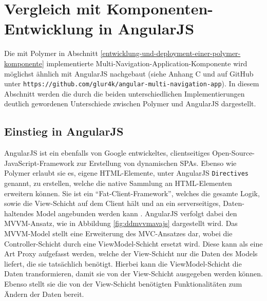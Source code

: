 \section{Vergleich mit Komponenten-Entwicklung in AngularJS}\label{vergleich-mit-komponenten-entwicklung-in-angularjs}

Die mit Polymer in Abschnitt \ref{entwicklung-und-deployment-einer-polymer-komponente} implementierte Multi-Navigation-Application-Kom\-po\-nen\-te wird möglichst ähnlich mit AngularJS nachgebaut (siehe Anhang C und auf GitHub unter \texttt{https://github.com/glur4k/angular-multi-navigation-app}). In diesem Abschnitt werden die durch die beiden unterschiedlichen Implementierungen deutlich gewordenen Unterschiede zwischen Polymer und AngularJS dargestellt.


\subsection{Einstieg in AngularJS}\label{einstieg-in-angularjs}

AngularJS ist ein ebenfalls von Google entwickeltes, clientseitiges Open-Source-JavaScript-Framework zur Erstellung von dynamischen \ac{SPA}s. Ebenso wie Polymer erlaubt sie es, eigene \ac{HTML}-Elemente, unter AngularJS \texttt{Directives} genannt, zu erstellen, welche die native Sammlung an \ac{HTML}-Elementen erweitern können. Sie ist ein ``Fat-Client-Framework'', welches die gesamte Logik, sowie die View-Schicht auf dem Client hält und an ein serverseitiges, Daten-haltendes Model angebunden werden kann \cite{citeulike:13920434}. AngularJS verfolgt dabei den \ac{MVVM}-Ansatz, wie in Abbildung \ref{fig:ddmvvmavajs} dargestellt wird. Das \ac{MVVM}-Model stellt eine Erweiterung des \ac{MVC}-Ansatzes dar, wobei die Controller-Schicht durch eine ViewModel-Schicht ersetzt wird. Diese kann als eine Art Proxy aufgefasst werden, welche der View-Schicht nur die Daten des Models liefert, die sie tatsächlich benötigt. Hierbei kann die ViewModel-Schicht die Daten transformieren, damit sie von der View-Schicht ausgegeben werden können. Ebenso stellt sie die von der View-Schicht benötigten Funktionalitäten zum Ändern der Daten bereit.

